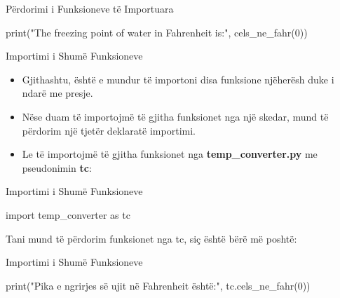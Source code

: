 \documentclass[
  ignorenonframetext,
]{beamer}
\newenvironment{Shaded}{\begin{snugshade}}{\end{snugshade}}
\newcommand{\BuiltInTok}[1]{#1}
\newcommand{\DecValTok}[1]{\textcolor[rgb]{0.00,0.00,0.81}{#1}}
\newcommand{\ImportTok}[1]{#1}
\newcommand{\NormalTok}[1]{#1}
\newcommand{\StringTok}[1]{\textcolor[rgb]{0.31,0.60,0.02}{#1}}
\begin{document}
\begin{frame}[fragile]{Përdorimi i Funksioneve të Importuara}
\protect\hypertarget{puxebrdorimi-i-funksioneve-tuxeb-importuara-1}{}
\begin{Shaded}
\begin{Highlighting}[]
\BuiltInTok{print}\NormalTok{(}\StringTok{"The freezing point of water in Fahrenheit is:"}\NormalTok{, cels\_ne\_fahr(}\DecValTok{0}\NormalTok{))}
\end{Highlighting}
\end{Shaded}
\end{frame}

\begin{frame}{Importimi i Shumë Funksioneve}
\protect\hypertarget{importimi-i-shumuxeb-funksioneve}{}
\begin{itemize}
\item
  Gjithashtu, është e mundur të importoni disa funksione njëherësh duke
  i ndarë me presje.
\item
  Nëse duam të importojmë të gjitha funksionet nga një skedar, mund të
  përdorim një tjetër deklaratë importimi.
\item
  Le të importojmë të gjitha funksionet nga \textbf{temp\_converter.py}
  me pseudonimin \textbf{tc}:
\end{itemize}
\end{frame}

\begin{frame}[fragile]{Importimi i Shumë Funksioneve}
\protect\hypertarget{importimi-i-shumuxeb-funksioneve-1}{}
\begin{Shaded}
\begin{Highlighting}[]
\ImportTok{import}\NormalTok{ temp\_converter }\ImportTok{as}\NormalTok{ tc}
\end{Highlighting}
\end{Shaded}

Tani mund të përdorim funksionet nga tc, siç është bërë më poshtë:
\end{frame}

\begin{frame}[fragile]{Importimi i Shumë Funksioneve}
\protect\hypertarget{importimi-i-shumuxeb-funksioneve-2}{}
\begin{Shaded}
\begin{Highlighting}[]
\BuiltInTok{print}\NormalTok{(}\StringTok{"Pika e ngrirjes së ujit në Fahrenheit është:"}\NormalTok{, tc.cels\_ne\_fahr(}\DecValTok{0}\NormalTok{))}
\end{Highlighting}
\end{Shaded}
\end{frame}
\end{document}
